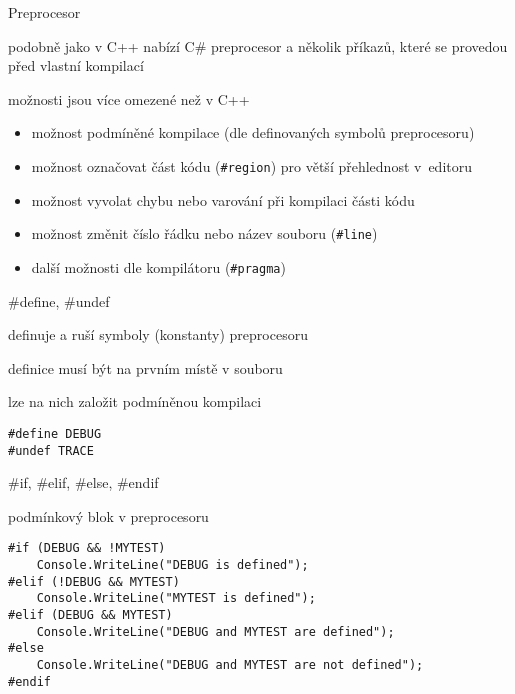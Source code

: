 

\begin{frame}[fragile]
\begin{bitemize}{Preprocesor}
\item podobně jako v C++ nabízí C\# preprocesor a několik příkazů, které se provedou před vlastní kompilací
\item možnosti jsou více omezené než v C++
\begin{itemize}
\item možnost podmíněné kompilace (dle definovaných symbolů preprocesoru)
\item možnost označovat část kódu (\lstinline|#region|) pro větší přehlednost v~editoru
\item možnost vyvolat chybu nebo varování při kompilaci části kódu 
\item možnost změnit číslo řádku nebo název souboru (\lstinline|#line|)
\item další možnosti dle kompilátoru (\lstinline|#pragma|)
\end{itemize}
\end{bitemize}

\end{frame}

\begin{frame}[fragile]
\vfill
\begin{bitemize}{\#define, \#undef}
\item definuje a ruší symboly (konstanty) preprocesoru
\item definice musí být na prvním místě v souboru
\item lze na nich založit podmíněnou kompilaci
\end{bitemize}
\vfill
\begin{yesblock}
\begin{lstlisting}
#define DEBUG
#undef TRACE
\end{lstlisting}
\end{yesblock}
\vfill
\end{frame}




\begin{frame}[fragile]
\vfill
\begin{bitemize}{\#if, \#elif, \#else, \#endif}
\item podmínkový blok v preprocesoru
\end{bitemize}
\vfill
\begin{yesblock}
\begin{lstlisting}[deletekeywords={if,else}]
#if (DEBUG && !MYTEST)
    Console.WriteLine("DEBUG is defined");
#elif (!DEBUG && MYTEST)
    Console.WriteLine("MYTEST is defined");
#elif (DEBUG && MYTEST)
    Console.WriteLine("DEBUG and MYTEST are defined");  
#else
    Console.WriteLine("DEBUG and MYTEST are not defined");
#endif
\end{lstlisting}
\end{yesblock}
\vfill
\end{frame}



